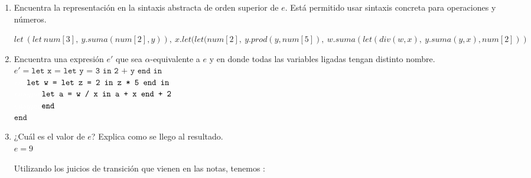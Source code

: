 \documentclass{article}
\begin{document}
\begin{enumerate}
{\begin{enumerate}
{\begin{table}[H]
\begin{tabular}{|l|l|l|l|}
            				5   & y               &  $x+y$                 &  $x+y$               \\ \hline
            			\end{tabular}
            		\end{table}
            	}
            \item {
            Encuentra la representación en la sintaxis abstracta de orden superior de $e$. Está permitido usar sintaxis concreta para operaciones y números.
            
        	$let \ (let\ num[3],\ y.suma(num[2], y)),\ x.let(let (num[2],\ y.prod(y, num[5]),\ w.suma(let(div(w,x),\ y.suma(y,x), num[2]))$\\
        	
        	
        	}
        	\item{
        	Encuentra una expresión $e'$ que sea $\alpha$-equivalente a $e$ y en donde todas las variables ligadas tengan distinto nombre.\\
        	
        	$e' = \texttt{let x = let y = 3 in 2 + y end in}$\\
        	$\textcolor{white}{eas}\texttt{let w = let z = 2 in z * 5 end in}$\\
        	$\textcolor{white}{easypie}\texttt{let a = w / x in a + x end + 2}$\\
        	$\textcolor{white}{easypie}\texttt{end}$\\
        	$\texttt{end}$\\
        	
        	}
        	\item {
        	¿Cuál es el valor de $e$? Explica como se llego al resultado.\\
        	
        	$e=9$
        	
        	Utilizando los juicios de transición que vienen en las notas, tenemos :\\
        	      	
}
\end{enumerate}}
\end{enumerate}
\end{document}

